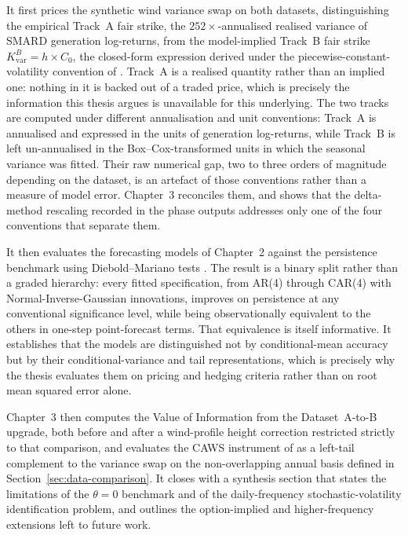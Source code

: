 \documentclass[11pt, a4paper, twoside]{article}
\begin{document}
It first prices the synthetic wind variance swap on both datasets, distinguishing the empirical Track~A fair strike, the $252\times$-annualised realised variance of SMARD generation log-returns, from the model-implied Track~B fair strike $K_{\text{var}}^B = h \times C_0$, the closed-form expression derived under the piecewise-constant-volatility convention of \citet{Tol1997}. Track~A is a realised quantity rather than an implied one: nothing in it is backed out of a traded price, which is precisely the information this thesis argues is unavailable for this underlying. The two tracks are computed under different annualisation and unit conventions: Track~A is annualised and expressed in the units of generation log-returns, while Track~B is left un-annualised in the Box--Cox-transformed units in which the seasonal variance was fitted. Their raw numerical gap, two to three orders of magnitude depending on the dataset, is an artefact of those conventions rather than a measure of model error. Chapter~3 reconciles them, and shows that the delta-method rescaling recorded in the phase outputs addresses only one of the four conventions that separate them.

It then evaluates the forecasting models of Chapter~2 against the persistence benchmark using Diebold--Mariano tests \citep{DieboldMariano1995, HarveyEtAl1997}. The result is a binary split rather than a graded hierarchy: every fitted specification, from AR(4) through CAR(4) with Normal-Inverse-Gaussian innovations, improves on persistence at any conventional significance level, while being observationally equivalent to the others in one-step point-forecast terms. That equivalence is itself informative. It establishes that the models are distinguished not by conditional-mean accuracy but by their conditional-variance and tail representations, which is precisely why the thesis evaluates them on pricing and hedging criteria rather than on root mean squared error alone.

Chapter~3 then computes the Value of Information from the Dataset~A-to-B upgrade, both before and after a wind-profile height correction restricted strictly to that comparison, and evaluates the CAWS instrument of \citet{AlexandridisZapranis2013} as a left-tail complement to the variance swap on the non-overlapping annual basis defined in Section~\ref{sec:data-comparison}. It closes with a synthesis section that states the limitations of the $\theta = 0$ benchmark and of the daily-frequency stochastic-volatility identification problem, and outlines the option-implied and higher-frequency extensions left to future work.
\end{document}
